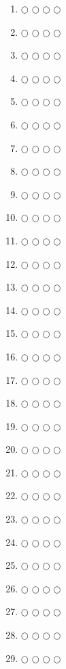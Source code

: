 \documentclass[a4paper,12pt]{article}
\begin{document}
\begin{multicols}{4}
\begin{enumerate}
  \item $\bigcirc$ $\bigcirc$ $\bigcirc$ $\bigcirc$
  \item $\bigcirc$ $\bigcirc$ $\bigcirc$ $\bigcirc$
  \item $\bigcirc$ $\bigcirc$ $\bigcirc$ $\bigcirc$
  \item $\bigcirc$ $\bigcirc$ $\bigcirc$ $\bigcirc$
  \item $\bigcirc$ $\bigcirc$ $\bigcirc$ $\bigcirc$
  \item $\bigcirc$ $\bigcirc$ $\bigcirc$ $\bigcirc$
  \item $\bigcirc$ $\bigcirc$ $\bigcirc$ $\bigcirc$
  \item $\bigcirc$ $\bigcirc$ $\bigcirc$ $\bigcirc$
  \item $\bigcirc$ $\bigcirc$ $\bigcirc$ $\bigcirc$
  \item $\bigcirc$ $\bigcirc$ $\bigcirc$ $\bigcirc$
  \item $\bigcirc$ $\bigcirc$ $\bigcirc$ $\bigcirc$
  \item $\bigcirc$ $\bigcirc$ $\bigcirc$ $\bigcirc$
  \item $\bigcirc$ $\bigcirc$ $\bigcirc$ $\bigcirc$
  \item $\bigcirc$ $\bigcirc$ $\bigcirc$ $\bigcirc$
  \item $\bigcirc$ $\bigcirc$ $\bigcirc$ $\bigcirc$
  \item $\bigcirc$ $\bigcirc$ $\bigcirc$ $\bigcirc$
  \item $\bigcirc$ $\bigcirc$ $\bigcirc$ $\bigcirc$
  \item $\bigcirc$ $\bigcirc$ $\bigcirc$ $\bigcirc$
  \item $\bigcirc$ $\bigcirc$ $\bigcirc$ $\bigcirc$
  \item $\bigcirc$ $\bigcirc$ $\bigcirc$ $\bigcirc$
  \item $\bigcirc$ $\bigcirc$ $\bigcirc$ $\bigcirc$
  \item $\bigcirc$ $\bigcirc$ $\bigcirc$ $\bigcirc$
  \item $\bigcirc$ $\bigcirc$ $\bigcirc$ $\bigcirc$
  \item $\bigcirc$ $\bigcirc$ $\bigcirc$ $\bigcirc$
  \item $\bigcirc$ $\bigcirc$ $\bigcirc$ $\bigcirc$
  \item $\bigcirc$ $\bigcirc$ $\bigcirc$ $\bigcirc$
  \item $\bigcirc$ $\bigcirc$ $\bigcirc$ $\bigcirc$
  \item $\bigcirc$ $\bigcirc$ $\bigcirc$ $\bigcirc$
  \item $\bigcirc$ $\bigcirc$ $\bigcirc$ $\bigcirc$

\end{enumerate}
\end{multicols}
\end{document}

